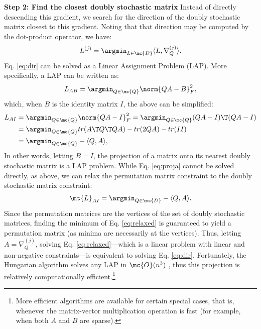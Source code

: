 \documentclass[10pt,journal,cspaper,compsoc]{IEEEtran}
\begin{document}
\textbf{Step 2: Find the closest doubly stochastic matrix} Instead of directly descending this gradient, we search for the direction of the doubly stochastic matrix closest to this gradient. Noting that that direction may be computed by the dot-product operator, we have:
\begin{align}\label{eq:dir}
	L^{(j)} = \argmin_{L \in \mc{D}} \langle L, \nabla_Q^{(j)} \rangle. %
\end{align}
Eq. \eqref{eq:dir} can be solved as a Linear Assignment Problem (LAP).  More specifically, a LAP can be written as:
\begin{align} \label{eq:LAP}
	L_{AB} = \argmin_{Q \in \mc{Q}} \norm{QA - B }^2_F,
\end{align}
which, when $B$ is the identity matrix $I$, the above can be simplified:
\begin{align} \label{eq:proja}
	L_{AI} &=\argmin_{Q \in \mc{Q}} \norm{QA - I}_F^2 
	= \argmin_{Q \in \mc{Q}} (QA-I)\T (QA-I) 
	\nonumber\\ &=\argmin_{Q \in \mc{Q}} tr (A\T Q\T QA) - tr(2QA) - tr(II) 
	\nonumber\\ &
	= \argmin_{Q \in \mc{Q}}  -\langle Q, A \rangle,
\end{align}
In other words, letting $B=I$, the projection of a matrix onto its nearest doubly stochastic matrix is a LAP problem.  While Eq. \eqref{eq:proja} cannot be solved directly, as above, we can relax the permutation matrix constraint to the doubly stochastic matrix constraint:
\begin{align}\label{eq:relaxed}
	\mt{L}_{AI} = \argmin_{Q\in\mc{D}} -\langle Q, A \rangle. 
\end{align}
Since the permutation matrices are the vertices of the set of doubly stochastic matrices, finding the minimum of Eq. \eqref{eq:relaxed} is guaranteed to yield a permutation matrix (as minima are necessarily at the vertices).  Thus, letting $A=\nabla_Q^{(j)}$, solving Eq. \eqref{eq:relaxed}---which is a linear problem with linear and non-negative constraints---is equivalent to solving Eq. \eqref{eq:dir}. 
Fortunately, the Hungarian algorithm solves any LAP in $\mc{O}(n^3)$ \cite{Burkard2009}, thus this projection is relatively computationally efficient.\footnote{More efficient algorithms are available for certain special cases, that is, whenever the matrix-vector multiplication operation is fast (for example, when both $A$ and $B$ are sparse).}
\end{document}
